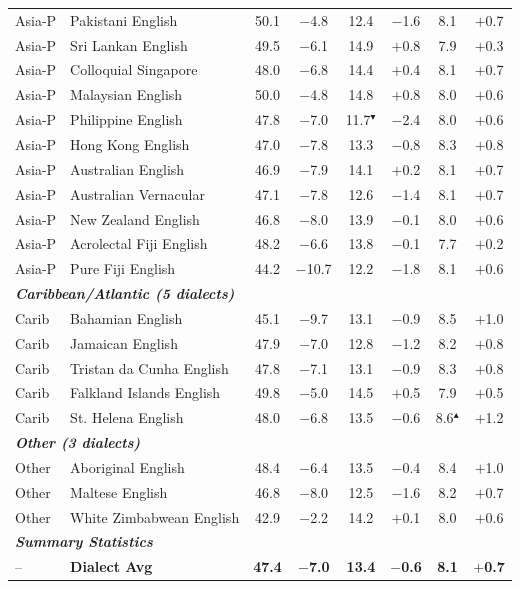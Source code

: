 \begin{table}[t]
\begin{tabular}{ll cc cc cc}
Asia-P & Pakistani English & 50.1 & $-$4.8 & 12.4 & $-$1.6 & 8.1 & $+$0.7 \\
Asia-P & Sri Lankan English & 49.5 & $-$6.1 & 14.9 & $+$0.8 & 7.9 & $+$0.3 \\
Asia-P & Colloquial Singapore & 48.0 & $-$6.8 & 14.4 & $+$0.4 & 8.1 & $+$0.7 \\
Asia-P & Malaysian English & 50.0 & $-$4.8 & 14.8 & $+$0.8 & 8.0 & $+$0.6 \\
Asia-P & Philippine English & 47.8 & $-$7.0 & 11.7$^\blacktriangledown$ & $-$2.4 & 8.0 & $+$0.6 \\
Asia-P & Hong Kong English & 47.0 & $-$7.8 & 13.3 & $-$0.8 & 8.3 & $+$0.8 \\
Asia-P & Australian English & 46.9 & $-$7.9 & 14.1 & $+$0.2 & 8.1 & $+$0.7 \\
Asia-P & Australian Vernacular & 47.1 & $-$7.8 & 12.6 & $-$1.4 & 8.1 & $+$0.7 \\
Asia-P & New Zealand English & 46.8 & $-$8.0 & 13.9 & $-$0.1 & 8.0 & $+$0.6 \\
Asia-P & Acrolectal Fiji English & 48.2 & $-$6.6 & 13.8 & $-$0.1 & 7.7 & $+$0.2 \\
Asia-P & Pure Fiji English & 44.2 & $-$10.7 & 12.2 & $-$1.8 & 8.1 & $+$0.6 \\
\midrule
\multicolumn{8}{l}{\textit{\textbf{Caribbean/Atlantic (5 dialects)}}} \\
Carib & Bahamian English & 45.1 & $-$9.7 & 13.1 & $-$0.9 & 8.5 & $+$1.0 \\
Carib & Jamaican English & 47.9 & $-$7.0 & 12.8 & $-$1.2 & 8.2 & $+$0.8 \\
Carib & Tristan da Cunha English & 47.8 & $-$7.1 & 13.1 & $-$0.9 & 8.3 & $+$0.8 \\
Carib & Falkland Islands English & 49.8 & $-$5.0 & 14.5 & $+$0.5 & 7.9 & $+$0.5 \\
Carib & St. Helena English & 48.0 & $-$6.8 & 13.5 & $-$0.6 & 8.6$^\blacktriangle$ & $+$1.2 \\
\midrule
\multicolumn{8}{l}{\textit{\textbf{Other (3 dialects)}}} \\
Other & Aboriginal English & 48.4 & $-$6.4 & 13.5 & $-$0.4 & 8.4 & $+$1.0 \\
Other & Maltese English & 46.8 & $-$8.0 & 12.5 & $-$1.6 & 8.2 & $+$0.7 \\
Other & White Zimbabwean English & 42.9 & $-$2.2 & 14.2 & $+$0.1 & 8.0 & $+$0.6 \\
\midrule
\multicolumn{8}{l}{\textit{\textbf{Summary Statistics}}} \\
-- & \textbf{Dialect Avg} & \textbf{47.4} & \textbf{$-$7.0} & \textbf{13.4} & \textbf{$-$0.6} & \textbf{8.1} & \textbf{$+$0.7} \\
\bottomrule
\end{tabular}
\end{table}